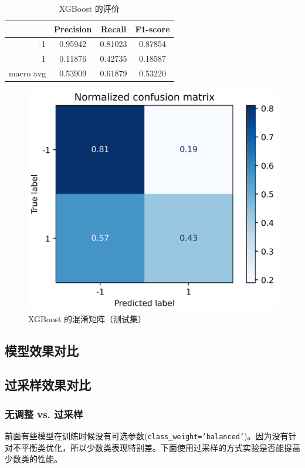 \documentclass[a4paper]{article}
\begin{document}
\begin{table}[!h]
    \centering
    \renewcommand{\arraystretch}{1.5}
    \begin{tabular}{|r|c|c|c|}
        \hline
                  & Precision & Recall & F1-score \\ \hline
        -1        &     0.95942     &     0.81023   &    0.87854      \\ \hline
        1         &     0.11876      &     0.42735   &   0.18587       \\ \hline
        macro avg &      0.53909     &     0.61879   &    0.53220      \\ \hline
    \end{tabular}
    \caption{XGBoost 的评价}
    \label{tb:xgb}
\end{table}

\begin{figure}[!h]
    \centering
    \includegraphics[width=0.48\linewidth]{xgboost_confus_mat-norm.png}
    \caption{XGBoost 的混淆矩阵（测试集）}
    \label{fig:result:xgb}
\end{figure}


\subsection{模型效果对比}

\subsection{过采样效果对比}
\label{sec:resample}

\subsubsection{无调整 vs. 过采样}

前面有些模型在训练时候没有可选参数(\texttt{class\_weight='balanced'})。因为没有针对不平衡类优化，所以少数类表现特别差。下面使用过采样的方式实验是否能提高少数类的性能。
\end{document}
